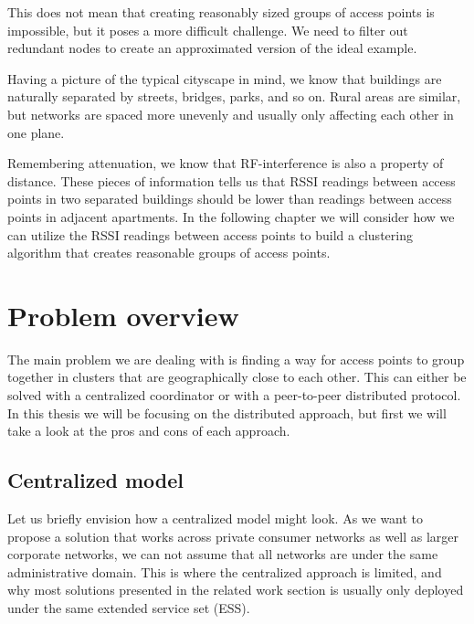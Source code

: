 This does not mean that creating reasonably sized groups of access points is impossible, but it poses a more difficult challenge. 
We need to filter out redundant nodes to create an approximated version of the ideal example.

Having a picture of the typical cityscape in mind, we know that buildings are naturally
separated by streets, bridges, parks, and so on. Rural areas are similar, but networks are spaced more unevenly
and usually only affecting each other in one plane.

Remembering attenuation, we know that RF-interference is also a property of distance. 
These pieces of information tells us that RSSI readings between access points in two separated buildings should be lower than readings between access points in adjacent apartments.
In the following chapter we will consider how we can utilize the RSSI readings between access points to build a clustering algorithm that creates reasonable groups of access points. 


\section{Problem overview}
The main problem we are dealing with is finding a way for access points to group together in clusters that are geographically close to each other. This can either be solved with a centralized
coordinator or with a peer-to-peer distributed protocol. In this thesis we will be focusing on the distributed approach, but first we will take a look at the pros and cons of each approach.

\subsection{Centralized model}
Let us briefly envision how a centralized model might look. As we want to propose a solution that works across private consumer networks as well as larger corporate networks,
we can not assume that all networks are under the same administrative domain. This is where the centralized approach is limited, and why most solutions presented in the related work section is usually only deployed under the same extended service set (ESS).

